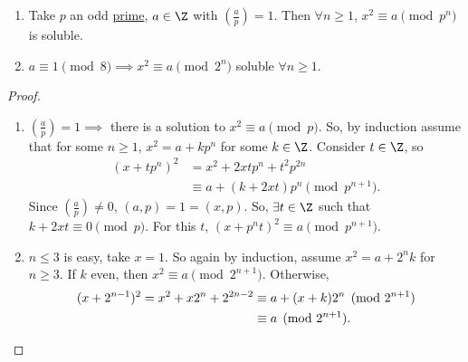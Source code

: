 \documentclass{article}
\newcommand{\legendre}[2]{\genfrac{(}{)}{}{}{#1}{#2}}
\begin{document}
\begin{nlemma}\label{lem:4.11}\leavevmode
    \begin{enumerate}[label=(\roman*)]
        \item Take $p$ an odd \hyperlink{def:prime}{prime}, $a \in \Z$ with $\legendre{a}{p} = 1$.
            Then $\forall n \geq 1$, $x^2 \equiv a \pmod{p^n}$ is soluble.
        \item $a \equiv 1 \pmod{8} \implies x^2 \equiv a \pmod{2^n}$ soluble $\forall n \geq 1$.
    \end{enumerate}
\end{nlemma}

\begin{proof}\leavevmode
    \begin{enumerate}[label=(\roman*)]
        \item $\legendre{a}{p} = 1 \implies $ there is a solution to $x^2 \equiv a \pmod{p}$.
            So, by induction assume that for some $n \geq 1$, $x^2 = a + k p^n$ for some $k \in \Z$.
            Consider $t \in \Z$, so
            \begin{align*}
                (x + t p^n)^2 &= x^2 + 2 x t p^n + t^2 p^{2n} \\
                              &\equiv a + (k+ 2xt)p^n \pmod{p^{n+1}}.
            \end{align*}
            Since $\legendre{a}{p} \neq 0$, $(a, p) = 1 = (x, p)$. So, $\exists t \in \Z$ such that $k + 2 x t \equiv 0 \pmod{p}$.
            For this $t$, $(x + p^n t)^2 \equiv a \pmod{p^{n+1}}$.
        \item $n \leq 3$ is easy, take $x=1$.
            So again by induction, assume $x^2 = a + 2^n k$ for $n \geq 3$.
            If $k$ even, then $x^2 \equiv a \pmod{2^{n+1}}$. Otherwise,
            \begin{align*}
                (x + 2^{n-1})^2 = x^2 + x 2^n + 2^{2n-2} &\equiv a + (x+k)2^n \pmod{2^{n+1}} \\
                                                         &\equiv a \pmod{2^{n+1}}.\qedhere
            \end{align*}
    \end{enumerate}
\end{proof}
\end{document}
